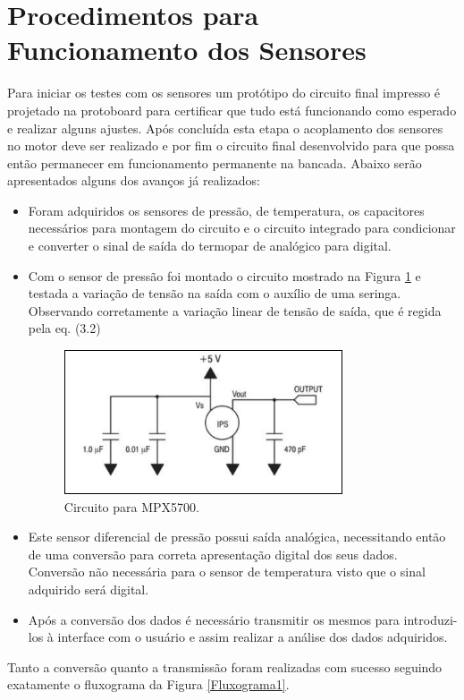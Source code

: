 \section{Procedimentos para Funcionamento dos Sensores}
Para iniciar os testes com os sensores um protótipo do circuito final impresso é projetado na protoboard para certificar que tudo está funcionando como esperado e realizar alguns ajustes. Após concluída esta etapa o acoplamento dos sensores no motor deve ser realizado e por fim o circuito final desenvolvido para que possa então permanecer em funcionamento permanente na bancada.
Abaixo serão apresentados alguns dos avanços já realizados:
\begin{itemize}
\item Foram adquiridos os sensores de pressão, de temperatura, os capacitores necessários para montagem do circuito e o circuito integrado para condicionar e converter o sinal de saída do termopar de analógico para digital.
\item Com o sensor de pressão foi montado o circuito mostrado na Figura \ref{Circuitompx} e testada a variação de tensão na saída com o auxílio de uma seringa. Observando corretamente a variação linear de tensão de saída, que é regida pela eq. (3.2)
\begin{figure}[h!]
	\centering
	\includegraphics[keepaspectratio=true,scale= 1.5]{figuras/circuito_mpx.PNG}
	\caption{ Circuito para MPX5700.}
	\label{Circuitompx}
\end{figure}
\item Este sensor diferencial de pressão possui saída analógica, necessitando então de uma conversão para correta apresentação digital dos seus dados. Conversão não necessária para o sensor de temperatura visto que o sinal adquirido será digital.
\item Após a conversão dos dados é necessário transmitir os mesmos para introduzi-los à interface com o usuário e assim realizar a análise dos dados adquiridos.
\end{itemize}
Tanto a conversão quanto a transmissão foram realizadas com sucesso seguindo exatamente o fluxograma da Figura \ref{Fluxograma1}.
